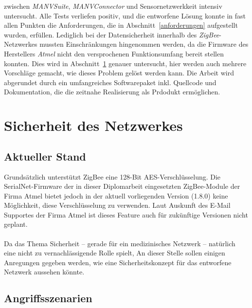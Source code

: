zwischen \emph{MANVSuite}, \emph{MANVConnector} und Sensornetzwerkkeit intensiv untersucht. Alle Tests verliefen
positiv, und die entworfene Lösung konnte in fast allen Punkten die Anforderungen, die in Abschnitt~\ref{anforderungen}
aufgestellt wurden, erfüllen. Lediglich bei der Datensicherheit innerhalb des \emph{ZigBee}-Netzwerkes mussten
Einschränkungen hingenommen werden, da die Firmware des Herstellers \emph{Atmel} nicht den versprochenen
Funktionsumfang bereit stellen konnten. Dies wird in Abschnitt~\ref{Sicherheit} genauer untersucht, hier werden
auch mehrere Vorschläge gemacht, wie dieses Problem gelöst werden kann. Die Arbeit wird abgerundet durch ein
umfangreiches Softwarepaket inkl. Quellcode und Dokumentation, die die zeitnahe Realisierung als Prdodukt ermöglichen.

\section{Sicherheit des Netzwerkes}
\label{Sicherheit}
\subsection{Aktueller Stand}
Grundsätzlich unterstützt ZigBee eine 128-Bit AES-Verschlüsselung. Die SerialNet-Firmware der in dieser Diplomarbeit
eingesetzten ZigBee-Module der Firma Atmel bietet jedoch in der aktuell vorliegenden Version (1.8.0) keine Möglichkeit,
diese Verschlüsselung zu verwenden. Laut Auskunft des E-Mail Supportes der Firma Atmel ist dieses Feature auch für
zukünftige Versionen nicht geplant.\\
\\
Da das Thema Sicherheit -- gerade für ein medizinisches Netzwerk -- natürlich eine nicht zu vernachlässigende Rolle spielt,
An dieser Stelle sollen einigen Anregungen gegeben werden, wie eine Sicherheitskonzept für das entworfene Netzwerk aussehen 
könnte.

\subsection{Angriffsszenarien}

